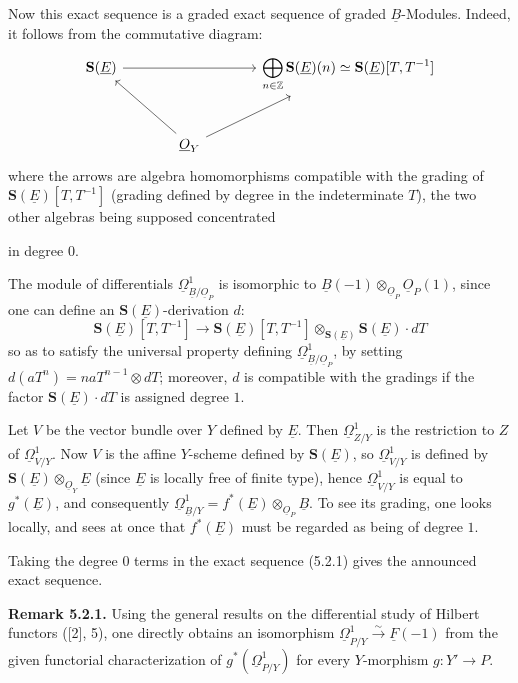 Now this exact sequence is a graded exact sequence of graded \(\underline{B}\)-Modules. Indeed, it follows from the commutative diagram:
\[
\begin{tikzcd}[column sep=large,row sep=large]
\mathbf{S}(\underline{E}) \arrow[rr] && \displaystyle\bigoplus_{n\in\mathbb Z}\mathbf{S}(\underline{E})(n)\simeq \mathbf{S}(\underline{E})[T,T^{-1}]\\
& \underline{O}_Y \arrow[ul] \arrow[ur] &
\end{tikzcd}
\]
where the arrows are algebra homomorphisms compatible with the grading of \(\mathbf{S}(\underline{E})[T,T^{-1}]\) (grading defined by degree in the indeterminate \(T\)), the two other algebras being supposed concentrated

%
in degree \(0\).

The module of differentials \(\underline{\Omega}^1_{\underline{B}/\underline{O}_P}\) is isomorphic to \(\underline{B}(-1)\otimes_{\underline{O}_P}\underline{O}_P(1)\), since one can define an \(\mathbf{S}(\underline{E})\)-derivation \(d\):
\[
\mathbf{S}(\underline{E})[T,T^{-1}]
\longrightarrow
\mathbf{S}(\underline{E})[T,T^{-1}]\otimes_{\mathbf{S}(\underline{E})}\mathbf{S}(\underline{E})\cdot dT
\]
so as to satisfy the universal property defining \(\underline{\Omega}^1_{\underline{B}/\underline{O}_P}\), by setting \(d(aT^n)=naT^{n-1}\otimes dT\); moreover, \(d\) is compatible with the gradings if the factor \(\mathbf{S}(\underline{E})\cdot dT\) is assigned degree \(1\).

Let \(V\) be the vector bundle over \(Y\) defined by \(\underline{E}\). Then \(\underline{\Omega}^1_{Z/Y}\) is the restriction to \(Z\) of \(\underline{\Omega}^1_{V/Y}\). Now \(V\) is the affine \(Y\)-scheme defined by \(\mathbf{S}(\underline{E})\), so \(\underline{\Omega}^1_{V/Y}\) is defined by \(\mathbf{S}(\underline{E})\otimes_{\underline{O}_Y}\underline{E}\) (since \(\underline{E}\) is locally free of finite type), hence \(\underline{\Omega}^1_{V/Y}\) is equal to \(g^*(\underline{E})\), and consequently \(\underline{\Omega}^1_{\underline{B}/Y}=f^*(\underline{E})\otimes_{\underline{O}_P}\underline{B}\). To see its grading, one looks locally, and sees at once that \(f^*(\underline{E})\) must be regarded as being of degree \(1\).

Taking the degree \(0\) terms in the exact sequence (5.2.1) gives the announced exact sequence.

\textbf{Remark 5.2.1.} Using the general results on the differential study of Hilbert functors ([2], 5), one directly obtains an isomorphism \(\underline{\Omega}^1_{P/Y}\xrightarrow{\sim}\underline{F}(-1)\) from the given functorial characterization of \(g^*(\underline{\Omega}^1_{P/Y})\) for every \(Y\)-morphism \(g:Y'\to P\).

